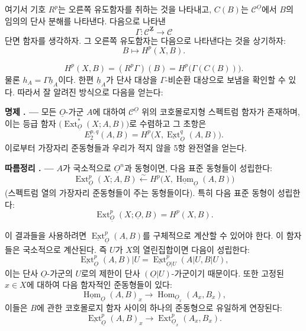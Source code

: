 \documentclass[11pt,twoside,openany]{book}
\numberwithin{equation}{section}
\newcommand{\sourceunit}{front}
\newcommand{\src}[1]{%
  \phantomsection\hypertarget{src:\sourceunit:#1}{}%
  \marginpar{\raggedleft\footnotesize\sffamily #1}%
}
\newcommand{\Osh}{\underline{O}}
\newcommand{\Zsh}{\underline{\mathbf Z}}
\newcommand{\Ccat}{\mathcal C}
\newcommand{\Homsh}{\underline{\operatorname{Hom}}}
\newcommand{\Extsh}{\underline{\operatorname{Ext}}}
\newcommand{\hsh}{\underline{h}}
\newcommand{\fquote}[1]{\textquotedbl#1\textquotedbl}
\theoremstyle{plain}
\theoremstyle{definition}
\theoremstyle{remark}
\newcommand{\result}[2]{%
  \par\medskip\noindent\textbf{#1%
  \if\relax\detokenize{#2}\relax\else\space#2\fi. ---}\enspace
}
\begin{document}
여기서 기호 $R^{p}$는 오른쪽 유도함자를 취하는 것을 나타내고,
$C(B)$는 $\Ccat^{\Osh}$에서 $B$의 임의의 단사 분해를 나타낸다.
다음으로 나타낸
\[
  \Gamma:\Ccat^{\Zsh}\longrightarrow\Ccat
\]
\fquote{단면} 함자를 생각하자. 그 오른쪽 유도함자는 다음으로
나타낸다는 것을 상기하자:
\[
  B\longmapsto H^{p}(X,B).
\]

\src{170}
\begin{equation}\tag{1.3}
  H^{p}(X,B)=(R^{p}\Gamma)(B)=H^{p}\bigl(\Gamma(C(B))\bigr).
\end{equation}
물론 $h_A=\Gamma\hsh_A$이다. 한편 $\hsh_A$가
단사 대상을 $\Gamma$-비순환 대상으로 보냄을 확인할 수 있다. 따라서
잘 알려진 방식으로 다음을 얻는다:

\result{명제}{1} 모든 $\Osh$-가군 $A$에 대하여 $\Ccat^{\Osh}$ 위의
코호몰로지형 스펙트럼 함자가 존재하며, 이는 등급 함자
$\bigl(\operatorname{Ext}_{\Osh}^{*}(X;A,B)\bigr)$로 수렴하고 그 초항은
\begin{equation}\tag{1.4}
  E_{2}^{p,q}(A,B)=H^{p}\bigl(X,\Extsh_{\Osh}^{q}(A,B)\bigr).
\end{equation}
이로부터 \fquote{가장자리 준동형}들과 우리가 적지 않을 5항
완전열을 얻는다.

\result{따름정리}{1} $A$가 국소적으로 $\Osh^{n}$과 동형이면, 다음 표준
동형들이 성립한다:
\begin{equation}\tag{1.5}
  \operatorname{Ext}_{\Osh}^{p}(X;A,B)
  \overset{\sim}{\longleftarrow}
  H^{p}\bigl(X,\Homsh_{\Osh}(A,B)\bigr)
\end{equation}
(스펙트럼 열의 가장자리 준동형들이 주는 동형들이다). 특히 다음 표준
동형이 성립한다:
\begin{equation}\tag{1.6}
  \operatorname{Ext}_{\Osh}^{p}(X;\Osh,B)=H^{p}(X,B).
\end{equation}

이 결과들을 사용하려면 $\Extsh_{\Osh}^{p}(A,B)$를 구체적으로
계산할 수 있어야 한다. 이 함자들은 국소적으로 계산된다.
즉 $U$가 $X$의 열린집합이면 다음이 성립한다:
\[
  \Extsh_{\Osh}^{p}(A,B)|U
  =\Extsh_{\Osh|U}^{p}(A|U,B|U),
\]
이는 단사 $\Osh$-가군의 $U$로의 제한이
단사 $(\Osh|U)$-가군이기 때문이다. 또한 고정된 $x\in X$에 대하여
다음 함자적인 준동형들이 있다:
\begin{equation}\tag{1.7}
  \Homsh_{\Osh}(A,B)_x
  \longrightarrow
  \operatorname{Hom}_{\Osh_x}(A_x,B_x),
\end{equation}
이들은 $B$에 관한 코호몰로지 함자 사이의 하나의 준동형으로 유일하게
연장된다:
\begin{equation}\tag{1.8}
  \Extsh_{\Osh}^{p}(A,B)_x
  \longrightarrow
  \operatorname{Ext}_{\Osh_x}^{p}(A_x,B_x).
\end{equation}
\end{document}
